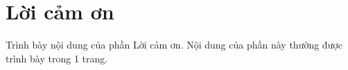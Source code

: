 \chapter*{Lời cảm ơn}

Trình bày nội dung của phần Lời cảm ơn. Nội dung của phần này thường được trình bày trong 1 trang.
